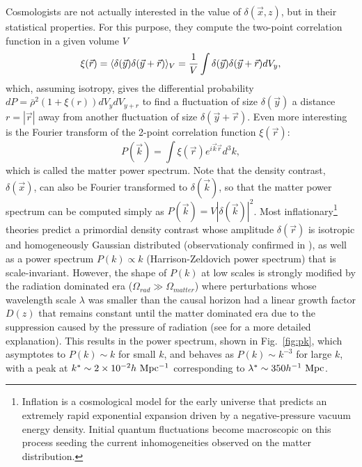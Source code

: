 Cosmologists are not actually interested in the value of $\delta(\vec{x},z)$, but in their statistical properties. For this purpose, they compute the two-point correlation function in a given volume $V$
\begin{equation}
\xi(\vec{r}) = \langle \delta(\vec{y}) \delta(\vec{y}+\vec{r}) \rangle_V = {1 \over V}\int \delta(\vec{y})\delta(\vec{y}+\vec{r})dV_y,
\end{equation}
which, assuming isotropy, gives the differential probability $dP = \bar{\rho}^2(1+\xi(r))dV_ydV_{y+r}$ to find a fluctuation of size $\delta (\vec{y})$ a distance $r=|\vec{r}|$ away from another fluctuation of size $\delta (\vec{y}+\vec{r})$. Even more interesting is the Fourier transform of the 2-point correlation function $\xi(\vec{r})$:
\begin{equation}
P(\vec{k}) = \int \xi(\vec{r})e^{i\vec{k}\vec{r}}d^3k,
\end{equation}
which is called the matter power spectrum. Note that the density contrast, $\delta({\vec{x}})$, can also be Fourier transformed to $\delta({\vec{k}})$, so that the matter power spectrum can be computed simply as $P(\vec{k})=V|\delta(\vec{k})|^2$. Most inflationary\footnote{Inflation is a cosmological model for the early universe that predicts an extremely rapid exponential expansion driven by a negative-pressure vacuum energy density. Initial quantum fluctuations become macroscopic on this process seeding the current inhomogeneities observed on the matter distribution.} theories predict a primordial density contrast whose amplitude $\delta(\vec{r})$ is isotropic and homogeneously Gaussian distributed (observationaly confirmed in \citet{komatsu2009}), as well as a power spectrum $P(k) \propto k$ (Harrison-Zeldovich power spectrum) that is scale-invariant. However, the shape of $P(k)$ at low scales is strongly modified by the radiation dominated era ($\Omega_{rad} \gg \Omega_{matter}$) where perturbations whose wavelength scale $\lambda$ was smaller than the causal horizon had a linear growth factor $D(z)$ that remains constant until the matter dominated era due to the suppression caused by the pressure of radiation (see \cite{Dodelson2003} for a more detailed explanation). This results in the power spectrum, shown in Fig.~\ref{fig:pk}, which asymptotes to $P(k)\sim k$ for small $k$, and behaves as $P(k)\sim k^{-3}$ for large $k$, with a peak at $k^\ast \sim 2 \times 10^{-2} h\ \rm Mpc^{-1}$ corresponding to $\lambda^\ast\sim 350 h^{-1}\ \rm Mpc$.
